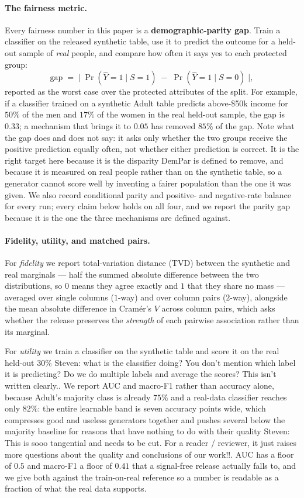 \documentclass{article}
\newcommand{\s}[1]{\textcolor{Dandelion}{Steven: #1}}
\begin{document}
\paragraph{The fairness metric.}
Every fairness number in this paper is a \textbf{demographic-parity gap}.
Train a classifier on the released synthetic table, use it to predict the
outcome for a held-out sample of \emph{real} people, and compare how often it
says yes to each protected group:
\[
  \mathrm{gap} \;=\; \bigl|\;\Pr(\hat{Y}{=}1 \mid S{=}1)\;-\;\Pr(\hat{Y}{=}1 \mid S{=}0)\;\bigr| ,
\]
reported as the worst case over the protected attributes of the split. For
example, if a classifier trained on a synthetic Adult table predicts
above-\$50k income for $50\%$ of the men and $17\%$ of the women in the real
held-out sample, the gap is $0.33$; a mechanism that brings it to $0.05$ has
removed $85\%$ of the gap. Note what the gap does and does not say: it asks
only whether the two groups receive the positive prediction equally often, not
whether either prediction is correct. It is the right target here because it
is the disparity DemPar is defined to remove, and because it is measured on
real people rather than on the synthetic table, so a generator cannot score
well by inventing a fairer population than the one it was given. We also
record conditional parity and positive- and negative-rate balance for every
run; every claim below holds on all four, and we report the parity gap because
it is the one the three mechanisms are defined against.

\paragraph{Fidelity, utility, and matched pairs.}
For \emph{fidelity} we report total-variation distance (TVD) between the
synthetic and real marginals --- half the summed absolute difference between
the two distributions, so $0$ means they agree exactly and $1$ that they share
no mass --- averaged over single columns ($1$-way) and over column pairs
($2$-way), alongside the mean absolute difference in Cram\'er's $V$ across
column pairs, which asks whether the release preserves the \emph{strength} of
each pairwise association rather than its marginal.

For \emph{utility} we train a classifier on the synthetic table and score it
on the real held-out $30\%$ \s{what is the classifier doing? You don't mention which label it is predicting? Do we do multiple labels and average the scores? This isn't written clearly.}. We report AUC and macro-F1 rather than accuracy
alone, because Adult's majority class is already $75\%$ and a real-data
classifier reaches only $82\%$: the entire learnable band is seven accuracy
points wide, which compresses good and useless generators together and pushes
several below the majority baseline for reasons that have nothing to do with
their quality \s{This is sooo tangential and needs to be cut. For a reader / reviewer, it just raises more questions about the quality and conclusions of our work!!}. AUC has a floor of $0.5$ and macro-F1 a floor of $0.41$ that a
signal-free release actually falls to, and we give both against the
train-on-real reference so a number is readable as a fraction of what the real
data supports.
\end{document}
